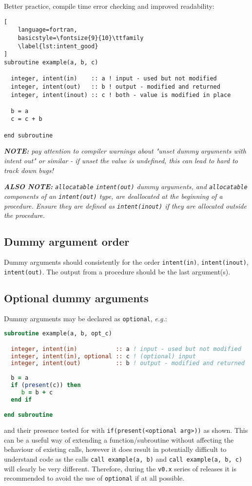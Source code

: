 \documentclass[11pt]{report}
\begin{document}
Better practice, compile time error checking and improved readability:
\begin{lstlisting}[
	language=fortran,
    basicstyle=\fontsize{9}{10}\ttfamily
    \label{lst:intent_good}
]
subroutine example(a, b, c)

  integer, intent(in)    :: a ! input - used but not modified
  integer, intent(out)   :: b ! output - modified and returned
  integer, intent(inout) :: c ! both - value is modified in place
  
  b = a
  c = c + b

end subroutine
\end{lstlisting}

\textit{\textbf{NOTE:} pay attention to compiler warnings about "unset dummy arguments with intent out" or similar - if unset the value is undefined, this can lead to hard to track down bugs!}

\textit{\textbf{ALSO NOTE:} \texttt{allocatable} \texttt{intent(out)} dummy arguments, and \texttt{allocatable} components of an \texttt{intent(out)} type, are deallocated at the beginning of a procedure. Ensure they are defined as \texttt{intent(inout)} if they are allocated outside the procedure.}

\subsection{Dummy argument order}
Dummy arguments should consistently for the order \texttt{intent(in)}, \texttt{intent(inout)}, \texttt{intent(out)}. The output from a procedure should be the last argument(s).
\subsection{Optional dummy arguments}
\label{sec:opt-dummy-args}

Dummy arguments may be declared as \texttt{optional}, \textit{e.g.}:
\begin{lstlisting}[language=fortran, basicstyle=\fontsize{9}{10}\ttfamily\label{lst:intent_good}]
subroutine example(a, b, opt_c)

  integer, intent(in)           :: a ! input - used but not modified
  integer, intent(in), optional :: c ! (optional) input
  integer, intent(out)          :: b ! output - modified and returned
  
  b = a
  if (present(c)) then
     b = b + c
  end if

end subroutine
\end{lstlisting}
and their presence tested for with \texttt{if(present(<optional arg>))} as shown.
This can be a useful way of extending a function/subroutine without affecting the behaviour of
existing calls, however it does result in potentially difficult to understand code as the calls
\texttt{call example(a, b)} and \texttt{call example(a, b, c)} will clearly be very different.
Therefore, during the \texttt{v0.x} series of releases it is recommended to avoid the use of
\texttt{optional} if at all possible.
\end{document}
